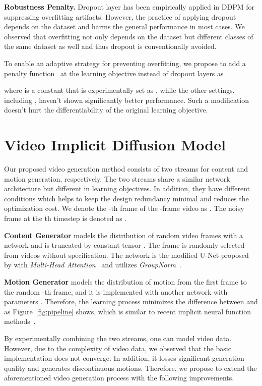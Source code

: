\documentclass[letterpaper]{article}
\begin{document}
\noindent \textbf{Robustness Penalty.}\label{sec:rob}
Dropout layer has been empirically applied in DDPM  for suppressing overfitting artifacts.
However, the practice of applying dropout depends on the dataset  and harms the general performance in most cases.
We observed that  overfitting not only depends on the dataset but different classes of the same dataset as well and thus dropout is conventionally avoided.

To enable an adaptive strategy for preventing overfitting, we propose to add a penalty function~\cite{charbonnier1994two} at the learning objective instead of dropout layers as

where  is a constant that is experimentally set as , while the other settings, including , haven't shown significantly better performance.
Such a modification doesn't hurt the differentiability of the original learning objective.





\section{Video Implicit Diffusion Model}
Our proposed video generation method consists of two streams for content and motion generation, respectively.
The two streams share a similar network architecture but different in learning objectives.  In addition, they have different conditions which helps to keep the design redundancy minimal and reduces the optimization cost. 
We denote the -th frame of the -frame video as . The noisy frame at the th timestep is denoted as .

\noindent \textbf{Content Generator} models the distribution of random video frames  with a network  and is truncated by constant tensor .
The frame  is randomly selected from videos  without specification.
The network  is the modified U-Net proposed by \citet{dhariwal2021diffusion} with \emph{Multi-Head Attention}~\cite{vaswani2017attention} and utilizes \emph{GroupNorm}~\cite{wu2018group}.

\noindent \textbf{Motion Generator} models the distribution of motion from the first frame to the random -th frame, and it is implemented with another network  with parameters .
Therefore, the learning process minimizes the difference between  and  as Figure~\ref{fig:pipeline} shows, which is similar to recent implicit neural function methods~\cite{yu2022generating,skorokhodov2021stylegan}.

By experimentally combining the two streams, one can model video data.
However, due to the complexity of video data, we observed that the basic implementation does not converge.  In addition, it losses significant generation quality and generates discontinuous motions.
Therefore, we propose to extend the aforementioned video generation process with the following improvements.
\end{document}
